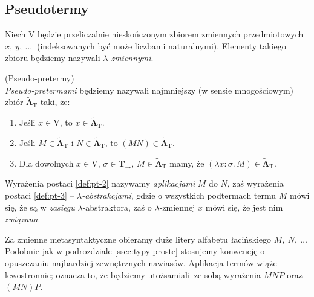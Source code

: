 \subsection{Pseudotermy}
  Niech \(\mathrm{V}\) będzie przeliczalnie nieskończonym zbiorem zmiennych przedmiotowych \(x,\ y,\ \dots\ \) (indeksowanych być może liczbami naturalnymi). Elementy takiego zbioru będziemy nazywali \emph{\(\lambda\)-zmiennymi}.
\begin{definicja}(Pseudo-pretermy)\\
  \emph{Pseudo-pretermami} będziemy nazywali najmniejszy (w sensie mnogościowym) zbiór \(\mathbf{\tilde\Lambda}_{\mathrm{T}}\) taki, że:

  \begin{enumerate}[label=(PT\arabic*)]
  \setlength\itemsep{0em}
  \item Jeśli \(x\in \mathrm{V}\), to \(x\in{\mathbf{\tilde\Lambda}}_{\mathrm{T}}\).\label{def:pt-1}
  \item Jeśli \(M\in\mathbf{\tilde{\Lambda}}_{\mathrm{T}}\) i \(N\in\mathbf{\tilde{\Lambda}}_{\mathrm{T}}\), to \((MN)\in\mathbf{\tilde{\Lambda}}_{\mathrm{T}}\).\label{def:pt-2}
  \item Dla dowolnych \(x\in \mathrm{V}\), \(\sigma\in\mathbf{T}_\to\), \(M\in\mathbf{\tilde{\Lambda}}_{\mathrm{T}}\) mamy, że \((\lambda x:{\sigma}.\,M)\in \mathbf{\tilde{\Lambda}}_{\mathrm{T}}\).\label{def:pt-3}
  \end{enumerate}
\end{definicja}
  Wyrażenia postaci \ref{def:pt-2} nazywamy \emph{aplikacjami} \(M\) do \(N\), zaś wyrażenia postaci \ref{def:pt-3} -- \emph{\(\lambda\)-abstrakcjami}, gdzie o wszystkich podtermach termu \(M\) mówi się, że są w \emph{zasięgu} \(\lambda\)-abstraktora, zaś o \(\lambda\)-zmiennej \(x\) mówi się, że jest nim \emph{związana}.

  Za zmienne metasyntaktyczne obieramy duże litery alfabetu łacińskiego \(M,\ N,\ \dots\ \) Podobnie jak w podrozdziale \ref{ssec:typy-proste} stosujemy konwencję o opuszczaniu najbardziej zewnętrznych nawiasów. Aplikacja termów wiąże lewostronnie; oznacza to, że będziemy utożsamiali ze sobą wyrażenia \(MNP\) oraz \((MN)P\).

